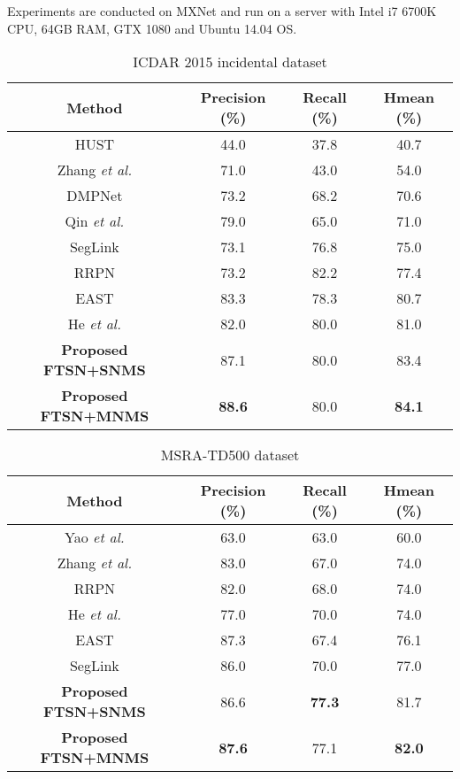 \documentclass[a4paper,conference]{IEEEtran}
\begin{document}
Experiments are conducted on MXNet\cite{chen2015mxnet} and run on a server with Intel i7 6700K CPU, 64GB RAM, GTX 1080 and Ubuntu 14.04 OS.
\begin{table}[htbp]
 \caption{\label{tab:1} ICDAR 2015 incidental dataset}
 \begin{center}
\begin{tabular}
{c||c|c|c}
Method & Precision (\%) & Recall (\%) & Hmean (\%) \\
\hline\hline
 HUST\cite{Karatzas2015ICDAR} & 44.0 & 37.8 & 40.7 \\
 Zhang \emph{et al.}\cite{zhang2016multi_oriented} & 71.0 & 43.0 & 54.0\\
 DMPNet\cite{Liu2017deep} & 73.2 & 68.2 & 70.6 \\
Qin \emph{et al.}\cite{Qin2017Cascaded} & 79.0 & 65.0 & 71.0 \\
SegLink\cite{Shi2017Detecting}  & 73.1 & 76.8 & 75.0 \\
RRPN\cite{Ma2017arbitrary} & 73.2 & 82.2 & 77.4 \\
EAST\cite{Zhou2017EAST} & 83.3 & 78.3 & 80.7 \\
He \emph{et al.}\cite{He2017deep_direct} & 82.0 & 80.0 & 81.0\\
\hline\hline
\textbf{Proposed FTSN+SNMS} & 87.1 & 80.0 & 83.4 \\
\textbf{Proposed FTSN+MNMS} & \textbf{88.6} & 80.0 & \textbf{84.1} \\
\hline
 \end{tabular}
 \end{center}
\end{table}
\begin{table}[htbp]
 \caption{\label{tab:2} MSRA-TD500 dataset}
 \begin{center}
\begin{tabular}
{c||c|c|c}
Method & Precision (\%) & Recall (\%) & Hmean (\%) \\
\hline\hline
 Yao \emph{et al.}\cite{yao2012detecting} & 63.0 & 63.0 & 60.0 \\
 Zhang \emph{et al.}\cite{zhang2016multi_oriented} & 83.0 & 67.0 & 74.0\\
RRPN\cite{Ma2017arbitrary} & 82.0 & 68.0 & 74.0\\
He \emph{et al.}\cite{He2017deep_direct} & 77.0 & 70.0 & 74.0\\
EAST\cite{Zhou2017EAST} & 87.3 & 67.4 & 76.1 \\
SegLink\cite{Shi2017Detecting}  & 86.0 & 70.0 & 77.0 \\
\hline\hline
\textbf{Proposed FTSN+SNMS} & 86.6 & \textbf{77.3} & 81.7 \\
\textbf{Proposed FTSN+MNMS} & \textbf{87.6} & 77.1 & \textbf{82.0} \\
\hline
 \end{tabular}
 \end{center}
\end{table}
\end{document}
